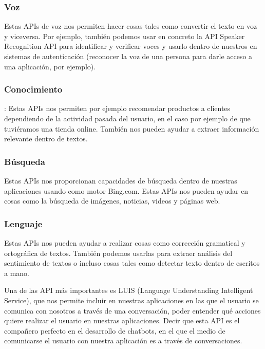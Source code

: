 \subsubsection{Voz} Estas APIs de voz nos permiten hacer cosas tales como convertir el texto en voz y viceversa. Por ejemplo, también podemos usar en concreto la API Speaker Recognition API para identificar y verificar voces y usarlo dentro de nuestros en sistemas de autenticación (reconocer la voz de una persona para darle acceso a una aplicación, por ejemplo).

\subsubsection{Conocimiento}: Estas APIs nos permiten por ejemplo recomendar productos a clientes dependiendo de la actividad pasada del usuario, en el caso por ejemplo de que tuviéramos una tienda online. También nos pueden ayudar a extraer información relevante dentro de textos.

\subsubsection{Búsqueda} Estas APIs nos proporcionan capacidades de búsqueda dentro de nuestras aplicaciones usando como motor Bing.com. Estas APIs nos pueden ayudar en cosas como la búsqueda de imágenes, noticias, videos y páginas web.

\subsubsection{Lenguaje} Estas APIs nos pueden ayudar a realizar cosas como corrección gramatical y ortográfica de textos. También podemos usarlas para extraer análisis del sentimiento de textos o incluso cosas tales como detectar texto dentro de escritos a mano.

Una de las API más importantes es LUIS (Language Understanding Intelligent Service), que nos permite incluir en nuestras aplicaciones en las que el usuario se comunica con nosotros a través de una conversación, poder entender qué acciones quiere realizar el usuario en nuestras aplicaciones. Decir que esta API es el compañero perfecto en el desarrollo de chatbots, en el que el medio de comunicarse el usuario con nuestra aplicación es a través de conversaciones.

